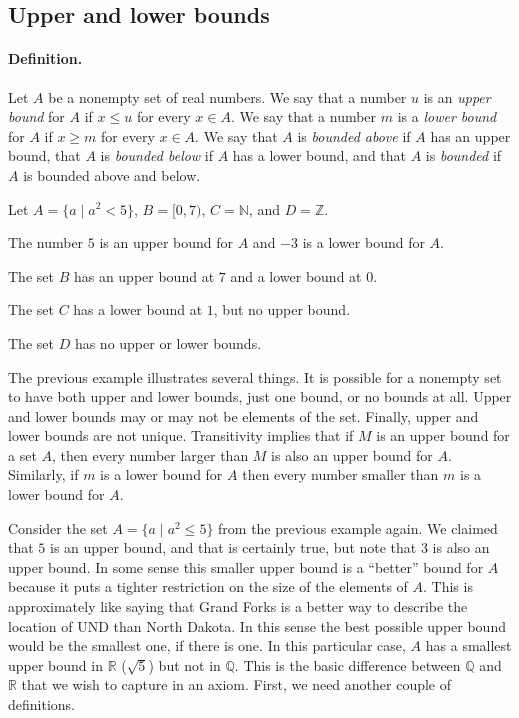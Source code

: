 \subsection{Upper and lower bounds}

\paragraph{Definition.} Let $A$ be a nonempty set of real numbers. We say that a number $u$ is an \emph{upper bound} for $A$ if $x\leq u$ for every $x\in A$. We say that a number $m$ is a \emph{lower bound} for $A$ if $x\geq m$ for every $x\in A$. We say that $A$ is \emph{bounded above}   if $A$ has an upper bound, that $A$ is \emph{bounded below} if $A$ has a lower bound, and that $A$ is \emph{bounded} if $A$ is bounded above and below.

\begin{example}
Let $A=\{ a\mid a^2<5 \}$, $B= [0,7)$, $C=\mathbb N$, and $D=\mathbb Z$.

The number $5$ is an upper bound for $A$ and $-3$ is a lower bound for $A$.

The set $B$ has an upper bound at $7$ and a lower bound at $0$.

The set $C$ has a lower bound at $1$, but no upper bound.

The set $D$ has no upper or lower bounds.
\end{example}

The previous example illustrates several things. It is possible for a nonempty set to have both upper and lower bounds, just one bound, or no bounds at all. Upper and lower bounds may or may not be elements of the set. Finally, upper and lower bounds are not unique. Transitivity implies that if $M$ is an upper bound for a set $A$, then every number larger than $M$ is also an upper bound for $A$. Similarly, if $m$ is a lower bound for $A$ then every number smaller than $m$ is a lower bound for $A$.

Consider the set $A=\{ a\mid a^2\leq 5 \}$ from the previous example again. We claimed that $5$ is an upper bound, and that is certainly true, but note that $3$ is also an upper bound. In some sense this smaller upper bound is a ``better'' bound for $A$ because it puts a tighter restriction on the size of the elements of $A$. This is approximately like saying that Grand Forks is a better way to describe the location of UND than North Dakota. In this sense the best possible upper bound would be the smallest one, if there is one. In this particular case, $A$ has a smallest upper bound in $\mathbb R$ ($\sqrt5$) but not in $\mathbb Q$. This is the basic difference between $\mathbb Q$ and $\mathbb R$ that we wish to capture in an axiom. First,
we need another couple of definitions.

